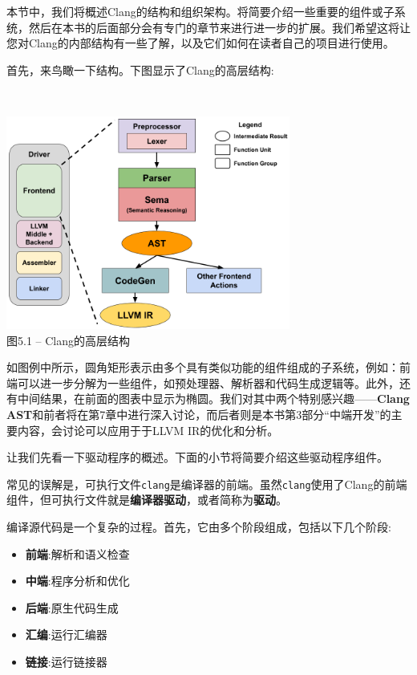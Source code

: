 
本节中，我们将概述Clang的结构和组织架构。将简要介绍一些重要的组件或子系统，然后在本书的后面部分会有专门的章节来进行进一步的扩展。我们希望这将让您对Clang的内部结构有一些了解，以及它们如何在读者自己的项目进行使用。

首先，来鸟瞰一下结构。下图显示了Clang的高层结构:

\hspace*{\fill} \\ %
\begin{center}
\includegraphics[width=0.7\textwidth]{content/2/chapter5/images/1.png}\\
图5.1 – Clang的高层结构
\end{center}

如图例中所示，圆角矩形表示由多个具有类似功能的组件组成的子系统，例如：前端可以进一步分解为一些组件，如预处理器、解析器和代码生成逻辑等。此外，还有中间结果，在前面的图表中显示为椭圆。我们对其中两个特别感兴趣——\textbf{Clang AST}和前者将在第7章中进行深入讨论，而后者则是本书第3部分“中端开发”的主要内容，会讨论可以应用于于LLVM IR的优化和分析。

让我们先看一下驱动程序的概述。下面的小节将简要介绍这些驱动程序组件。


常见的误解是，可执行文件\texttt{clang}是编译器的前端。虽然\texttt{clang}使用了Clang的前端组件，但可执行文件就是\textbf{编译器驱动}，或者简称为\textbf{驱动}。

编译源代码是一个复杂的过程。首先，它由多个阶段组成，包括以下几个阶段:

\begin{itemize}
\item \textbf{前端}:解析和语义检查
\item \textbf{中端}:程序分析和优化
\item \textbf{后端}:原生代码生成
\item \textbf{汇编}:运行汇编器
\item \textbf{链接}:运行链接器
\end{itemize}

